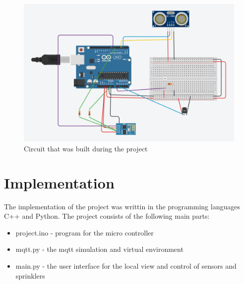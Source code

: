 \documentclass{article}
\begin{document}
\begin{figure}
    \centering
	\includegraphics[scale=0.3]{scheme_cropped.png}
	\caption{Circuit that was built during the project}
	\label{fig:scheme}
\end{figure}

\section{Implementation}
The implementation of the project was writtin in the programming languages C++ and Python. The project consists of the following main parts:
\begin{itemize}
    \item project.ino - program for the micro controller
	\item mqtt.py - the mqtt simulation and virtual environment 
	\item main.py - the user interface for the local view and control of sensors and sprinklers
\end{itemize}
\end{document}
